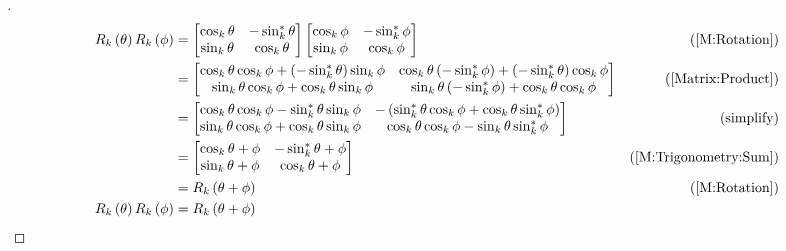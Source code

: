 \documentclass[../main.tex]{subfiles}
\begin{document}
\begin{proof}[]
    \begin{align*}
        R_k\left(\theta\right)R_k\left(\phi\right)
         & =\begin{bmatrix}
                \cos_k{\theta} & -\sin_k^\ast{\theta} \\
                \sin_k{\theta} & \cos_k{\theta}       \\
            \end{bmatrix}\begin{bmatrix}
                             \cos_k{\phi} & -\sin_k^\ast{\phi} \\
                             \sin_k{\phi} & \cos_k{\phi}       \\
                         \end{bmatrix}                                                       & \text{(\cref{M:Rotation})}              \\
         & =\begin{bmatrix}
                \cos_k{\theta}\cos_k{\phi}+\left(-\sin_k^\ast{\theta}\right)\sin_k{\phi} &
                \cos_k{\theta}\left(-\sin_k^\ast{\phi}\right)+\left(-\sin_k^\ast{\theta}\right)\cos_k{\phi} \\
                \sin_k{\theta}\cos_k{\phi}+\cos_k{\theta}\sin_k{\phi}                    &
                \sin_k{\theta}\left(-\sin_k^\ast{\phi}\right)+\cos_k{\theta}\cos_k{\phi}                    \\
            \end{bmatrix} & \text{(\cref{Matrix:Product})}                                \\
         & =\begin{bmatrix}
                \cos_k{\theta}\cos_k{\phi}-\sin_k^\ast{\theta}\sin_k{\phi} &
                -\left(\sin_k^\ast{\theta}\cos_k{\phi}+\cos_k{\theta}\sin_k^\ast{\phi}\right) \\
                \sin_k{\theta}\cos_k{\phi}+\cos_k{\theta}\sin_k{\phi}      &
                \cos_k{\theta}\cos_k{\phi}-\sin_k{\theta}\sin_k^\ast{\phi}                    \\
            \end{bmatrix}               & \text{(simplify)}                                              \\
         & =\begin{bmatrix}
                \cos_k{\theta+\phi} & -\sin_k^\ast{\theta+\phi} \\
                \sin_k{\theta+\phi} & \cos_k{\theta+\phi}       \\
            \end{bmatrix}                                             & \text{(\cref{M:Trigonometry:Sum})}                             \\
         & = R_k\left(\theta+\phi\right)                                                                  & \text{(\cref{M:Rotation})} \\
        R_k\left(\theta\right)R_k\left(\phi\right)
         & = R_k\left(\theta+\phi\right)                                                                  & \qedhere
    \end{align*}
\end{proof}
\end{document}
